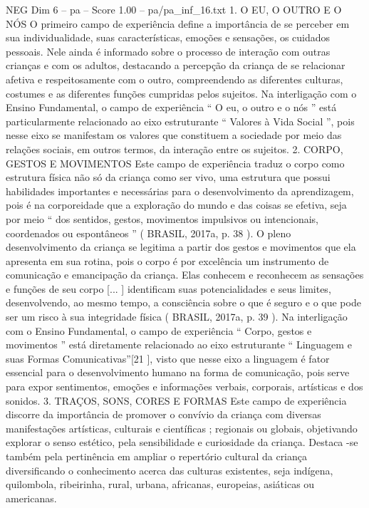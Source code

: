 \begin{textsample}{NEG Dim 6 – pa – Score 1.00 – pa/pa\_inf\_16.txt}  \label{ex:f6_neg_226}
1.
O EU, O OUTRO E O NÓS O primeiro campo de experiência define a importância de se perceber em sua individualidade, suas características, emoções e sensações, os cuidados pessoais.
Nele ainda é informado sobre o processo de interação com outras crianças e com os adultos, destacando a percepção da criança de se relacionar afetiva e respeitosamente com o outro, compreendendo as diferentes culturas, costumes e as diferentes funções cumpridas pelos sujeitos.
Na interligação com o Ensino Fundamental, o campo de experiência “ O eu, o outro e o nós ” está particularmente relacionado ao eixo estruturante “ Valores à Vida Social ”, pois nesse eixo se manifestam os valores que constituem a sociedade por meio das relações sociais, em outros termos, da interação entre os sujeitos. 2.
CORPO, GESTOS E MOVIMENTOS Este campo de experiência traduz o corpo como estrutura física não só da criança como ser vivo, uma estrutura que possui habilidades importantes e necessárias para o desenvolvimento da aprendizagem, pois é na corporeidade que a exploração do mundo e das coisas se efetiva, seja por meio “ dos sentidos, gestos, movimentos impulsivos ou intencionais, coordenados ou espontâneos ” ( BRASIL, 2017a, p. 38 ).
O pleno desenvolvimento da criança se legitima a partir dos gestos e movimentos que ela apresenta em sua rotina, pois o corpo é por excelência um instrumento de comunicação e emancipação da criança.
Elas conhecem e reconhecem as sensações e funções de seu corpo [... ] identificam suas potencialidades e seus limites, desenvolvendo, ao mesmo tempo, a consciência sobre o que é seguro e o que pode ser um risco à sua integridade física ( BRASIL, 2017a, p. 39 ).
Na interligação com o Ensino Fundamental, o campo de experiência “ Corpo, gestos e movimentos ” está diretamente relacionado ao eixo estruturante “ Linguagem e suas Formas Comunicativas”[21 ], visto que nesse eixo a linguagem é fator essencial para o desenvolvimento humano na forma de comunicação, pois serve para expor sentimentos, emoções e informações verbais, corporais, artísticas e dos sonidos. 3.
TRAÇOS, SONS, CORES E FORMAS Este campo de experiência discorre da importância de promover o convívio da criança com diversas manifestações artísticas, culturais e científicas ; regionais ou globais, objetivando explorar o senso estético, pela sensibilidade e curiosidade da criança.
Destaca -se também pela pertinência em ampliar o repertório cultural da criança diversificando o conhecimento acerca das culturas existentes, seja indígena, quilombola, ribeirinha, rural, urbana, africanas, europeias, asiáticas ou americanas.

\end{textsample}
